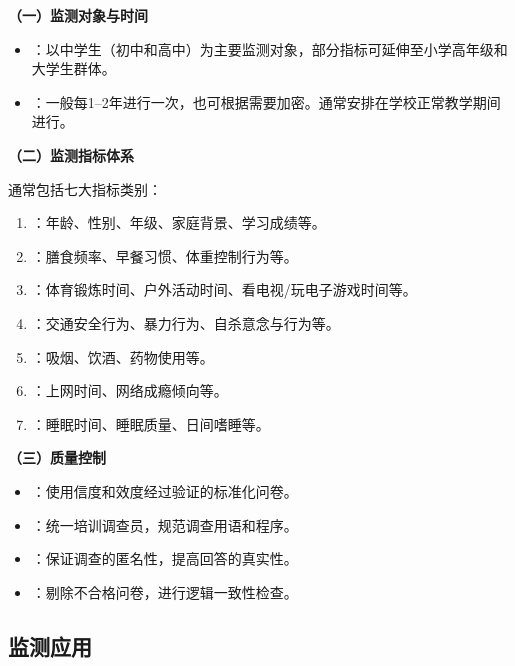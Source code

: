 \begin{keybox}
\textbf{（一）监测对象与时间}

\begin{itemize}[leftmargin=*]
    \item {}：以中学生（初中和高中）为主要监测对象，部分指标可延伸至小学高年级和大学生群体。
    \item {}：一般每1--2年进行一次，也可根据需要加密。通常安排在学校正常教学期间进行。
\end{itemize}

\textbf{（二）监测指标体系}

通常包括七大指标类别：

\begin{enumerate}[leftmargin=*]
    \item {}：年龄、性别、年级、家庭背景、学习成绩等。
    \item {}：膳食频率、早餐习惯、体重控制行为等。
    \item {}：体育锻炼时间、户外活动时间、看电视/玩电子游戏时间等。
    \item {}：交通安全行为、暴力行为、自杀意念与行为等。
    \item {}：吸烟、饮酒、药物使用等。
    \item {}：上网时间、网络成瘾倾向等。
    \item {}：睡眠时间、睡眠质量、日间嗜睡等。
\end{enumerate}

\textbf{（三）质量控制}

\begin{itemize}[leftmargin=*]
    \item {}：使用信度和效度经过验证的标准化问卷。
    \item {}：统一培训调查员，规范调查用语和程序。
    \item {}：保证调查的匿名性，提高回答的真实性。
    \item {}：剔除不合格问卷，进行逻辑一致性检查。
\end{itemize}
\end{keybox}

\subsection{监测应用}

